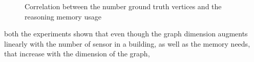 \begin{figure}
  \centering
  \caption{Correlation between the number ground truth vertices and the reasoning memory usage}
  \label{fig:vertexes_mem_chart}
\end{figure}
both the experiments shown that even though the graph dimension augments linearly with the number of sensor in a building, as well as the memory needs, that increase with the dimension of the graph,
